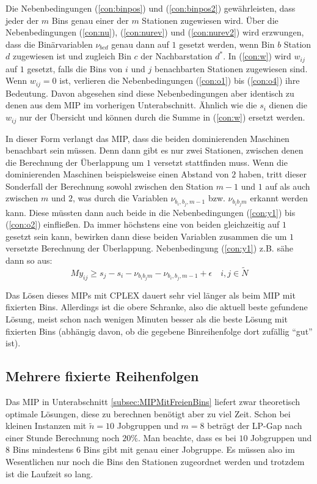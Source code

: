 \documentclass{scrreprt}
\begin{document}
Die Nebenbedingungen (\ref{con:binpos}) und (\ref{con:binpos2}) gewährleisten, dass jeder der $m$ Bins genau einer der $m$ Stationen zugewiesen wird.
Über die Nebenbedingungen (\ref{con:nu}), (\ref{con:nurev}) und (\ref{con:nurev2}) wird erzwungen, dass die Binärvariablen
$\nu_{bcd}$ genau dann auf $1$ gesetzt werden, wenn Bin $b$ Station $d$ zugewiesen ist und zugleich Bin $c$ der Nachbarstation $d^*$.
In (\ref{con:w}) wird $w_{ij}$ auf $1$ gesetzt, falls die Bins von $i$ und $j$ benachbarten Stationen zugewiesen sind.
Wenn $w_{ij}=0$ ist, verlieren die Nebenbedingungen (\ref{con:o1}) bis (\ref{con:o4}) ihre Bedeutung.
Davon abgesehen sind diese Nebenbedingungen aber identisch zu denen aus dem MIP im vorherigen Unterabschnitt.
Ähnlich wie die $s_i$ dienen die $w_{ij}$ nur der Übersicht und können durch die Summe in (\ref{con:w}) ersetzt werden.

In dieser Form verlangt das MIP, dass die beiden dominierenden Maschinen benachbart sein müssen.
Denn dann gibt es nur zwei Stationen, zwischen denen die Berechnung der Überlappung um $1$ versetzt stattfinden muss.
Wenn die dominierenden Maschinen beispielsweise einen Abstand von $2$ haben,
tritt dieser Sonderfall der Berechnung sowohl zwischen den Station $m-1$ und $1$ auf als auch zwischen $m$ und $2$,
was durch die Variablen $\nu_{b_i,b_j,m-1}$ bzw. $\nu_{b_ib_jm}$ erkannt werden kann.
Diese müssten dann auch beide in die Nebenbedingungen (\ref{con:y1}) bis (\ref{con:o2}) einfließen.
Da immer höchstens eine von beiden gleichzeitig auf $1$ gesetzt sein kann, 
bewirken dann diese beiden Variablen zusammen die um $1$ versetzte Berechnung der Überlappung.
Nebenbedingung (\ref{con:y1}) z.B. sähe dann so aus:
\[ My_{ij} \geq s_j - s_i - \nu_{b_ib_jm} - \nu_{b_i,b_j,m-1} + \epsilon \quad i,j\in\tilde{N} \]

Das Lösen dieses MIPs mit CPLEX dauert sehr viel länger als beim MIP mit fixierten Bins.
Allerdings ist die obere Schranke, also die aktuell beste gefundene Lösung, meist schon nach wenigen Minuten besser als die
beste Lösung mit fixierten Bins (abhängig davon, ob die gegebene Binreihenfolge dort zufällig "`gut"' ist).

\subsection{Mehrere fixierte Reihenfolgen}
Das MIP in Unterabschnitt \ref{subsec:MIPMitFreienBins} liefert zwar theoretisch optimale Lösungen, diese zu berechnen benötigt aber zu viel Zeit.
Schon bei kleinen Instanzen mit $\tilde{n}=10$ Jobgruppen und $m=8$ beträgt der LP-Gap nach einer Stunde Berechnung noch $20\%$.
Man beachte, dass es bei $10$ Jobgruppen und $8$ Bins mindestens $6$ Bins gibt mit genau einer Jobgruppe.
Es müssen also im Wesentlichen nur noch die Bins den Stationen zugeordnet werden und trotzdem ist die Laufzeit so lang.
\end{document}
